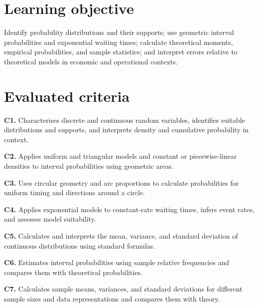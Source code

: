 \section*{Learning objective}
Identify probability distributions and their supports; use geometric interval probabilities and exponential waiting times; calculate theoretical moments, empirical probabilities, and sample statistics; and interpret errors relative to theoretical models in economic and operational contexts.\section*{Evaluated criteria}
	\textbf{C1.} Characterises discrete and continuous random variables, identifies suitable distributions and supports, and interprets density and cumulative probability in context.\par
	\textbf{C2.} Applies uniform and triangular models and constant or piecewise-linear densities to interval probabilities using geometric areas.\par
	\textbf{C3.} Uses circular geometry and arc proportions to calculate probabilities for uniform timing and directions around a circle.\par
	\textbf{C4.} Applies exponential models to constant-rate waiting times, infers event rates, and assesses model suitability.\par
	\textbf{C5.} Calculates and interprets the mean, variance, and standard deviation of continuous distributions using standard formulas.\par
	\textbf{C6.} Estimates interval probabilities using sample relative frequencies and compares them with theoretical probabilities.\par
	\textbf{C7.} Calculates sample means, variances, and standard deviations for different sample sizes and data representations and compares them with theory.
